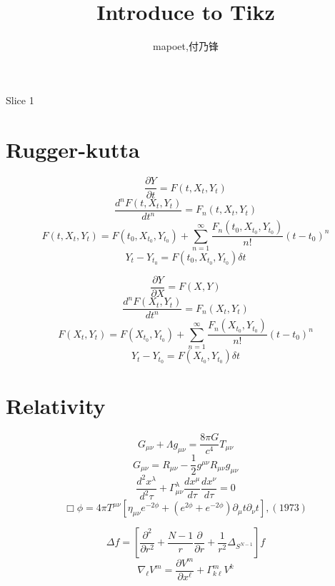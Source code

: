 \documentclass{beamer}
\author{mapoet,付乃锋}
\institute{Shao}
\title{Introduce to Tikz}
\begin{document}
\begin{frame}{Slice 1}
\maketitle
{}
\end{frame}
\section{Rugger-kutta}
\begin{frame}
$$\frac{\partial Y}{\partial t}=F(t,X_t,Y_t)$$
$$\frac{d^n F(t,X_t,Y_t)}{d t^n}=F_n(t,X_t,Y_t)$$
$$F(t,X_t,Y_t)=F(t_0,X_{t_0},Y_{t_0})+\sum_{n=1}^{\infty}{\frac{F_n(t_0,X_{t_0},Y_{t_0})}{n!}(t-t_0)^n}$$
$$Y_t - Y_{t_0}=F(t_0,X_{t_0},Y_{t_0}){\delta t}$$

\end{frame}
\begin{frame}
$$\frac{\partial Y}{\partial X}=F(X,Y)$$
$$\frac{d^n F(X_t,Y_t)}{d t^n}=F_n(X_t,Y_t)$$
$$F(X_t,Y_t)=F(X_{t_0},Y_{t_0})+\sum_{n=1}^{\infty}{\frac{F_n(X_{t_0},Y_{t_0})}{n!}(t-t_0)^n}$$
$$Y_t - Y_{t_0}=F(X_{t_0},Y_{t_0}){\delta t}$$

\end{frame}
\section{Relativity}
\begin{frame}
$$G_{\mu \nu}+\Lambda g_{\mu \nu}=\frac{8 \pi G}{c^4}T_{\mu\nu}$$
$$G_{\mu \nu}=R_{\mu \nu}-\frac{1}{2}g^{\mu \nu}R_{\mu \nu}g_{\mu\nu}$$
$$\frac{d^2 x^{\lambda}}{d^2  \tau}+\Gamma^{\lambda}_{\mu \nu}\frac{d x^{\mu}}{d \tau}\frac{d x^{\nu}}{d  \tau}=0$$
$$\Box \phi=4 \pi T^{\mu \nu}[\eta_{\mu \nu}e^{-2\phi}+(e^{2\phi}+e^{-2\phi})\partial_{\mu}t\partial_{\nu}t],(1973)$$
\end{frame}
\begin{frame}
$$
\Delta f=[\frac{\partial^2}{\partial r^2}+\frac{N-1}{r}\frac{\partial}{\partial r}+\frac{1}{r^2}\Delta_{S^{N-1}}]f
$$
$$
\nabla_\ell V^m=\frac{\partial V^m}{\partial x^\ell}+\Gamma^m_{k \ell}V^k
$$
\end{frame}
\end{document}
